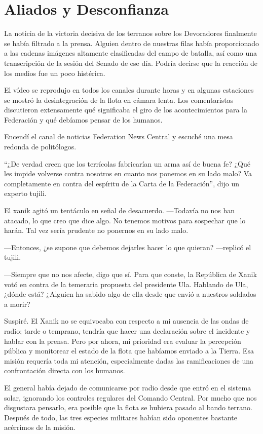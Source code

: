 \chapter{Aliados y Desconfianza}\label{sec:aliados-desconfianza}

La noticia de la victoria decisiva de los terranos sobre los Devoradores finalmente se había filtrado a la prensa. Alguien dentro de nuestras filas había proporcionado a las cadenas imágenes altamente clasificadas del campo de batalla, así como una transcripción de la sesión del Senado de ese día. Podría decirse que la reacción de los medios fue un poco histérica.

El vídeo se reprodujo en todos los canales durante horas y en algunas estaciones se mostró la desintegración de la flota en cámara lenta. Los comentaristas discutieron extensamente qué significaba el giro de los acontecimientos para la Federación y qué debíamos pensar de los humanos.

Encendí el canal de noticias Federation News Central y escuché una mesa redonda de politólogos.

“¿De verdad creen que los terrícolas fabricarían un arma así de buena fe? ¿Qué les impide volverse contra nosotros en cuanto nos ponemos en su lado malo? Va completamente en contra del espíritu de la Carta de la Federación”, dijo un experto tujili.

El xanik agitó un tentáculo en señal de desacuerdo. —Todavía no nos han atacado, lo que creo que dice algo. No tenemos motivos para sospechar que lo harán. Tal vez sería prudente no ponernos en su lado malo.

—Entonces, ¿se supone que debemos dejarles hacer lo que quieran? —replicó el tujili.

—Siempre que no nos afecte, digo que sí. Para que conste, la República de Xanik votó en contra de la temeraria propuesta del presidente Ula. Hablando de Ula, ¿dónde está? ¿Alguien ha sabido algo de ella desde que envió a nuestros soldados a morir?

Suspiré. El Xanik no se equivocaba con respecto a mi ausencia de las ondas de radio; tarde o temprano, tendría que hacer una declaración sobre el incidente y hablar con la prensa. Pero por ahora, mi prioridad era evaluar la percepción pública y monitorear el estado de la flota que habíamos enviado a la Tierra. Esa misión requería toda mi atención, especialmente dadas las ramificaciones de una confrontación directa con los humanos.

El general había dejado de comunicarse por radio desde que entró en el sistema solar, ignorando los controles regulares del Comando Central. Por mucho que nos disgustara pensarlo, era posible que la flota se hubiera pasado al bando terrano. Después de todo, las tres especies militares habían sido oponentes bastante acérrimos de la misión.

